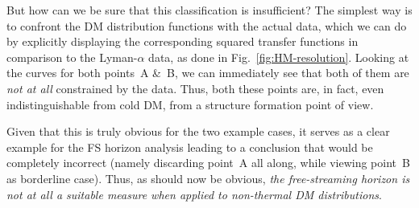But how can we be sure that this classification is insufficient? The simplest way is to confront the DM distribution functions with the actual data, which we can do by explicitly displaying the corresponding squared transfer functions in comparison to the Lyman-$\alpha$ data, as done in Fig.~\ref{fig:HM-resolution}. Looking at the curves for both points~A \&~B, we can immediately see that both of them are \emph{not at all} constrained by the data. Thus, both these points are, in fact, even indistinguishable from cold DM, from a structure formation point of view.

Given that this is truly obvious for the two example cases, it serves as a clear example for the FS horizon analysis leading to a conclusion that would be completely incorrect (namely discarding point~A all along, while viewing point~B as borderline case). Thus, as should now be obvious, \emph{the free-streaming horizon is not at all a suitable measure when applied to non-thermal DM distributions}.



